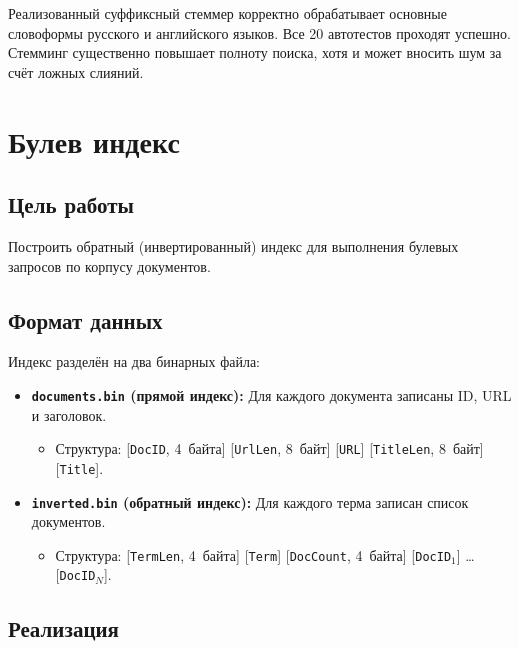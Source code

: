 \documentclass[12pt,a4paper]{article}
\begin{document}
Реализованный суффиксный стеммер корректно обрабатывает основные словоформы русского и английского языков. Все 20 автотестов проходят успешно. Стемминг существенно повышает полноту поиска, хотя и может вносить шум за счёт ложных слияний.

\newpage


\section{Булев индекс}

\subsection{Цель работы}

Построить обратный (инвертированный) индекс для выполнения булевых запросов по корпусу документов.

\subsection{Формат данных}

Индекс разделён на два бинарных файла:

\begin{itemize}
    \item \textbf{\texttt{documents.bin} (прямой индекс):} Для каждого документа записаны ID, URL и заголовок.
    \begin{itemize}
        \item Структура: [\texttt{DocID}, 4~байта] [\texttt{UrlLen}, 8~байт] [\texttt{URL}] [\texttt{TitleLen}, 8~байт] [\texttt{Title}].
    \end{itemize}

    \item \textbf{\texttt{inverted.bin} (обратный индекс):} Для каждого терма записан список документов.
    \begin{itemize}
        \item Структура: [\texttt{TermLen}, 4~байта] [\texttt{Term}] [\texttt{DocCount}, 4~байта] [\texttt{DocID$_1$}] \ldots [\texttt{DocID$_N$}].
    \end{itemize}
\end{itemize}

\subsection{Реализация}
\end{document}
